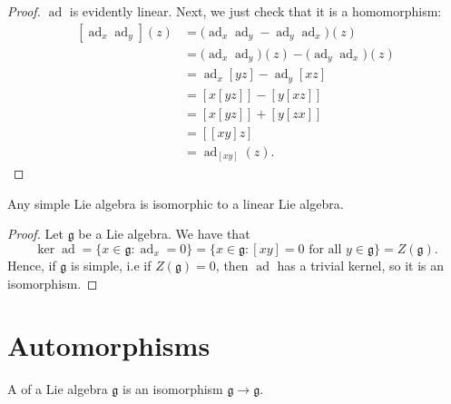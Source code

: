 \documentclass{article}
\newcommand{\lb}[1]{\ensuremath{\left[{#1}\right]}}
\DeclareMathOperator{\ad}{ad}
\newcommand{\frkg}{\ensuremath{\mathfrak{g}}}
\begin{document}
\begin{proof}
    $\ad$ is evidently linear.
    Next, we just check that it is a homomorphism:
    \begin{align*}
        \lb{\ad_x \ad_y}(z)
        &=
        \Big(\ad_x \ad_y - \ad_y \ad_x\Big)(z) 
        \\
        &=
        \Big(\ad_x \ad_y\Big)(z) - \Big(\ad_y \ad_x\Big)(z) 
        \\
        &=
        \ad_x \lb{yz} - \ad_y \lb{xz}
        \\
        &=
        \lb{x\lb{yz}} - \lb{y\lb{xz}}
        \\
        &=
        \lb{x\lb{yz}} + \lb{y\lb{zx}}
        \\
        &=
        \lb{\lb{xy}z}
        \\
        &=
        \ad_{\lb{xy}}(z).
    \end{align*}
\end{proof}

\begin{corollary}
    Any simple Lie algebra is isomorphic to a linear Lie algebra.
\end{corollary}

\begin{proof}
    Let $\frkg$ be a Lie algebra.
    We have that
    \[
        \ker \ad 
        =
        \Big\{
            x \in \frkg: \ad_x = 0
        \Big\}
        =
        \Big\{
            x \in \frkg: \lb{xy} = 0 \text{ for all } y \in \frkg
        \Big\}
        =
        Z(\frkg).
    \]
    Hence, if $\frkg$ is simple, i.e if $Z(\frkg) = 0$, then $\ad$ has a trivial kernel, so it is an isomorphism. 
\end{proof}

\section{Automorphisms}

\begin{definition}
    A  of a Lie algebra $\frkg$ is an isomorphism $\frkg \to \frkg$.
\end{definition}
\end{document}
